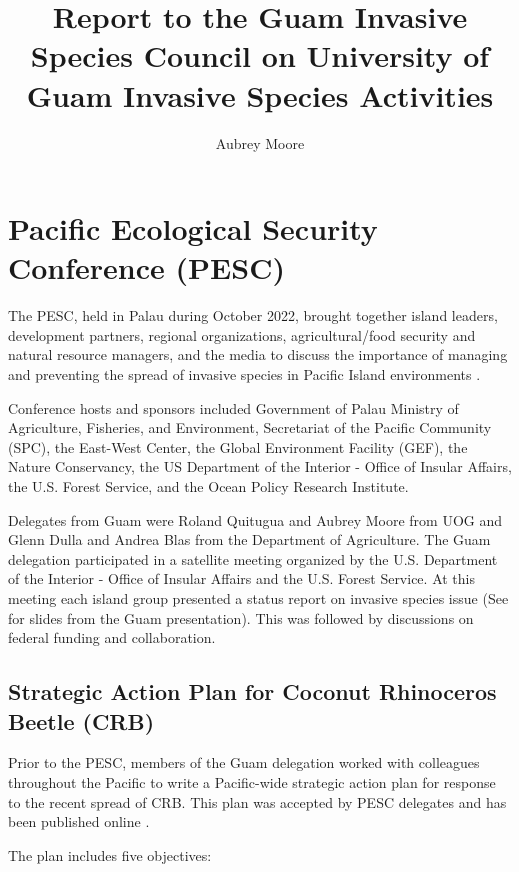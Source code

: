 \documentclass[twocolumn]{scrartcl}
\title{Report to the Guam Invasive Species Council on University of Guam Invasive Species Activities}
\author{Aubrey Moore}
\begin{document}
\maketitle

\section{Pacific Ecological Security Conference (PESC)}

The PESC, held in Palau during October 2022, brought together island leaders, development partners, regional organizations, agricultural/food security and natural resource managers, and the media to discuss the importance of managing and preventing the spread of invasive species in Pacific Island environments \cite{anonymousFirstPacificEcological2022}.

 Conference hosts and sponsors included Government of Palau Ministry of Agriculture, Fisheries, and Environment, Secretariat of the Pacific Community (SPC), the East-West Center, the Global Environment Facility (GEF), the Nature Conservancy, the US Department of the Interior - Office of Insular Affairs, the U.S. Forest Service, and the Ocean Policy Research Institute.

Delegates from Guam were Roland Quitugua and Aubrey Moore from UOG and Glenn Dulla and Andrea Blas from the Department of Agriculture. The Guam delegation participated in a satellite meeting organized by the U.S. Department of the Interior - Office of Insular Affairs and the U.S. Forest Service. At this meeting each island group presented a status report on invasive species issue (See \parencite{mooreOverviewInvasiveSpecies2022-10-06} for slides from the Guam presentation). This was followed by discussions on federal funding and collaboration.  

\subsection{Strategic Action Plan for Coconut Rhinoceros Beetle (CRB)}

Prior to the PESC, members of the Guam delegation worked with colleagues throughout the Pacific to write a Pacific-wide strategic action plan for response to the recent spread of CRB. This plan was accepted by PESC delegates and has been published online \cite{conferenceStrategicActionPlan2022}.

The plan includes five objectives:
\end{document}

